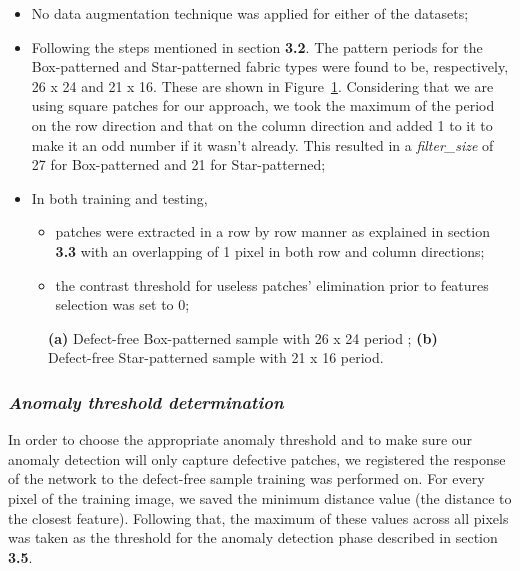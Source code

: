 \documentclass[3p,,preprint,review,12pt]{elsarticle}
\makeatletter
\def\fixFloatSize#1{}%
\makeatother
\begin{document}
\begin{itemize}
  \item \relax No data augmentation technique was applied for either of the datasets;
  \item \relax Following the steps mentioned in section \textbf{3.2}. The pattern periods for the Box-patterned and Star-patterned fabric types were found to be, respectively, 26 x 24 and 21 x 16. These are shown in Figure~\ref{f-36f8fabcc024}. Considering that we are using square patches for our approach, we took the maximum of the period on the row direction and that on the column direction and added 1 to it to make it an odd number if it wasn't already. This resulted in a \textit{filter\_size} of 27 for Box-patterned and 21 for Star-patterned;
  \item \relax In both training and testing, 

\begin{itemize}
  \item \relax patches were extracted in a row by row manner as explained in section \textbf{3.3} with an overlapping of 1 pixel in both row and column directions;
  \item \relax the contrast threshold for useless patches' elimination prior to features selection was set to 0;
\end{itemize}
  
\end{itemize}
  
\bgroup
\fixFloatSize{Figures/Figure6.jpg}
\begin{figure}[!htbp]
\centering \makeatletter{}
\makeatother 
\caption{{\textbf{(a)} Defect-free Box-patterned sample with 26 x 24 period ; \textbf{(b)} Defect-free Star-patterned sample with 21 x 16 period.}}
\label{f-36f8fabcc024}
\end{figure}
\egroup




\subsubsection{\textit{Anomaly threshold determination}}In order to choose the appropriate anomaly threshold and to make sure our anomaly detection will only capture defective patches, we registered the response of the network to the defect-free sample training was performed on. For every pixel of the training image, we saved the minimum distance value (the distance to the closest feature). Following that, the maximum of these values across all pixels was taken as the threshold for the anomaly detection phase described in section \textbf{3.5}.
\end{document}
